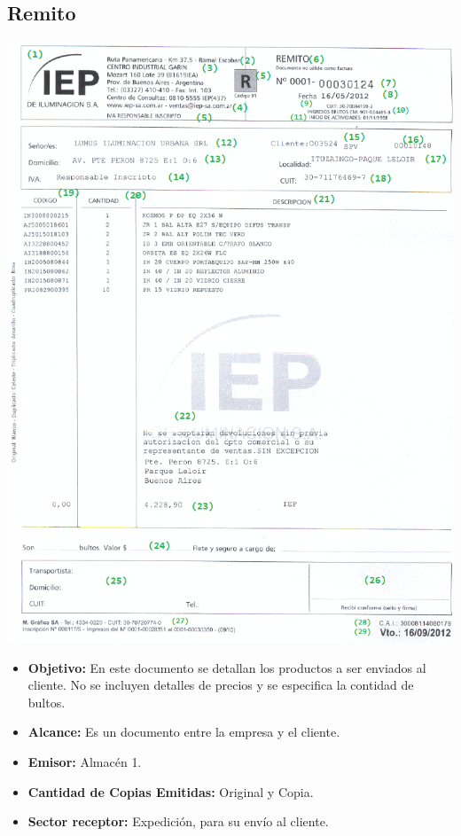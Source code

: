 \subsection{Remito}
\begin{center}
 \includegraphics[scale=0.90,keepaspectratio=true]{./Images/FormulariosIEP/Remito.png}
\end{center}
\begin{itemize}
  \item \textbf{Objetivo:} En este documento se detallan los productos a ser enviados al cliente. No se incluyen detalles de precios y se especifica la contidad de bultos.
  \item \textbf{Alcance:} Es un documento entre la empresa y el cliente.
  \item \textbf{Emisor:} Almacén 1.
  \item \textbf{Cantidad de Copias Emitidas:} Original y Copia.
  \item \textbf{Sector receptor:} Expedición, para su envío al cliente.
 \end{itemize}

